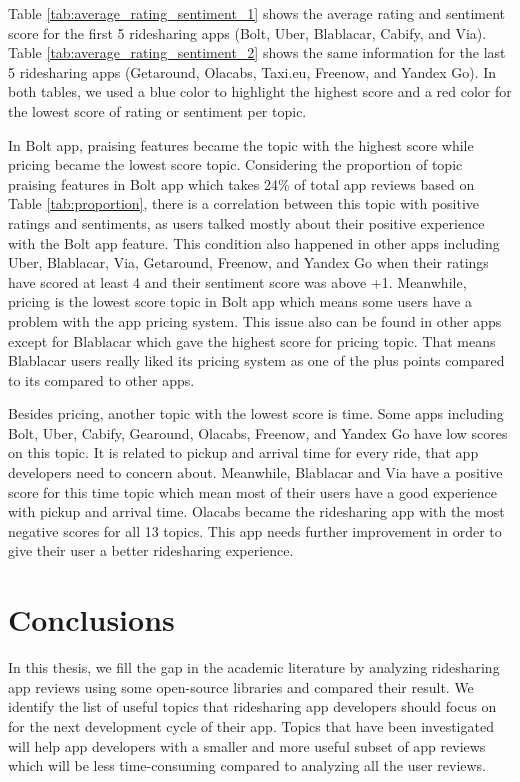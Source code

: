 \documentclass[12pt]{article}
\begin{document}
Table \ref{tab:average_rating_sentiment_1} shows the average rating and sentiment score for the first 5 ridesharing apps (Bolt, Uber, Blablacar, Cabify, and Via). Table \ref{tab:average_rating_sentiment_2} shows the same information for the last 5 ridesharing apps (Getaround, Olacabs, Taxi.eu, Freenow, and Yandex Go). In both tables, we used a blue color to highlight the highest score and a red color for the lowest score of rating or sentiment per topic.

In Bolt app, praising features became the topic with the highest score while pricing became the lowest score topic. Considering the proportion of topic praising features in Bolt app which takes 24\% of total app reviews based on Table \ref{tab:proportion}, there is a correlation between this topic with positive ratings and sentiments, as users talked mostly about their positive experience with the Bolt app feature. This condition also happened in other apps including Uber, Blablacar, Via, Getaround, Freenow, and Yandex Go when their ratings have scored at least 4 and their sentiment score was above +1. Meanwhile, pricing is the lowest score topic in Bolt app which means some users have a problem with the app pricing system. This issue also can be found in other apps except for Blablacar which gave the highest score for pricing topic. That means Blablacar users really liked its pricing system as one of the plus points compared to its compared to other apps.

Besides pricing, another topic with the lowest score is time. Some apps including Bolt, Uber, Cabify, Gearound, Olacabs, Freenow, and Yandex Go have low scores on this topic. It is related to pickup and arrival time for every ride, that app developers need to concern about. Meanwhile, Blablacar and Via have a positive score for this time topic which mean most of their users have a good experience with pickup and arrival time. Olacabs became the ridesharing app with the most negative scores for all 13 topics. This app needs further improvement in order to give their user a better ridesharing experience.

\newpage
\section{Conclusions}
In this thesis, we fill the gap in the academic literature by analyzing ridesharing app reviews using some open-source libraries and compared their result. We identify the list of useful topics that ridesharing app developers should focus on for the next development cycle of their app. Topics that have been investigated will help app developers with a smaller and more useful subset of app reviews which will be less time-consuming compared to analyzing all the user reviews. 
\end{document}
